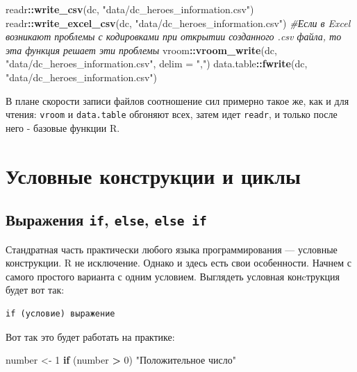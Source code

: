 \documentclass[]{book}
\newenvironment{Shaded}{\begin{snugshade}}{\end{snugshade}}
\newcommand{\KeywordTok}[1]{\textcolor[rgb]{0.13,0.29,0.53}{\textbf{#1}}}
\newcommand{\DataTypeTok}[1]{\textcolor[rgb]{0.13,0.29,0.53}{#1}}
\newcommand{\DecValTok}[1]{\textcolor[rgb]{0.00,0.00,0.81}{#1}}
\newcommand{\StringTok}[1]{\textcolor[rgb]{0.31,0.60,0.02}{#1}}
\newcommand{\CommentTok}[1]{\textcolor[rgb]{0.56,0.35,0.01}{\textit{#1}}}
\newcommand{\ControlFlowTok}[1]{\textcolor[rgb]{0.13,0.29,0.53}{\textbf{#1}}}
\newcommand{\OperatorTok}[1]{\textcolor[rgb]{0.81,0.36,0.00}{\textbf{#1}}}
\newcommand{\NormalTok}[1]{#1}
\begin{document}
\begin{Shaded}
\begin{Highlighting}[]
\NormalTok{readr}\OperatorTok{::}\KeywordTok{write_csv}\NormalTok{(dc, }\StringTok{"data/dc_heroes_information.csv"}\NormalTok{)}
\NormalTok{readr}\OperatorTok{::}\KeywordTok{write_excel_csv}\NormalTok{(dc, }\StringTok{"data/dc_heroes_information.csv"}\NormalTok{) }\CommentTok{#Если в Excel возникают проблемы с кодировками при открытии созданного .csv файла, то эта функция решает эти проблемы}
\NormalTok{vroom}\OperatorTok{::}\KeywordTok{vroom_write}\NormalTok{(dc, }\StringTok{"data/dc_heroes_information.csv"}\NormalTok{, }\DataTypeTok{delim =} \StringTok{","}\NormalTok{)}
\NormalTok{data.table}\OperatorTok{::}\KeywordTok{fwrite}\NormalTok{(dc, }\StringTok{"data/dc_heroes_information.csv"}\NormalTok{)}
\end{Highlighting}
\end{Shaded}

В плане скорости записи файлов соотношение сил примерно такое же, как и
для чтения: \texttt{vroom} и \texttt{data.table} обгоняют всех, затем
идет \texttt{readr}, и только после него - базовые функции R.

\chapter{Условные конструкции и циклы}\label{loops_conditions}

\section{\texorpdfstring{Выражения \texttt{if}, \texttt{else},
\texttt{else\ if}}{Выражения if, else, else if}}\label{if}

Стандратная часть практически любого языка программирования --- условные
конструкции. R не исключение. Однако и здесь есть свои особенности.
Начнем с самого простого варианта с одним условием. Выглядеть условная
конcтрукция будет вот так:

\begin{verbatim}
if (условие) выражение
\end{verbatim}

Вот так это будет работать на практике:

\begin{Shaded}
\begin{Highlighting}[]
\NormalTok{number <-}\StringTok{ }\DecValTok{1}
\ControlFlowTok{if}\NormalTok{ (number }\OperatorTok{>}\StringTok{ }\DecValTok{0}\NormalTok{) }\StringTok{"Положительное число"}
\end{Highlighting}
\end{Shaded}
\end{document}
